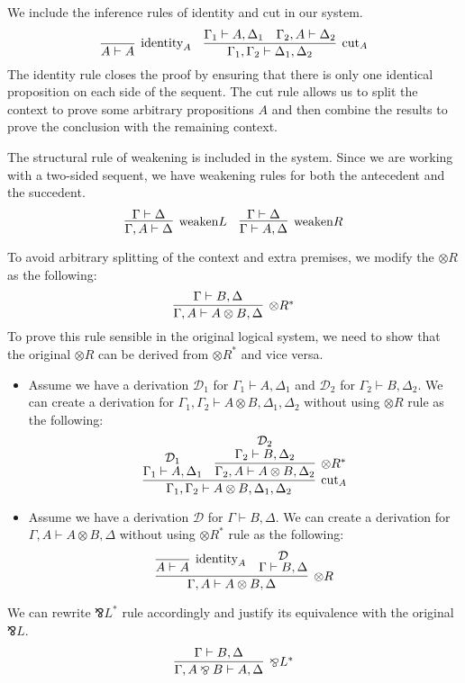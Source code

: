 \documentclass[12pt, openany]{memoir}
\newcommand*{\pare}[0]{\mathbin{\bindnasrepma}}
\begin{document}
We include the inference rules of identity and cut in our system.
\[
  \infer[\text{identity}_A]{A \vdash A}{}
  \quad
  \infer[\text{cut}_A]{\Gamma_1, \Gamma_2 \vdash \Delta_1, \Delta_2}{
    \Gamma_1 \vdash A, \Delta_1
    &
    \Gamma_2, A \vdash \Delta_2
  }
\]
The identity rule closes the proof by ensuring that there is only one identical proposition on each side of the sequent. 
The cut rule allows us to split the context to prove some arbitrary propositions $A$ 
and then combine the results to prove the conclusion with the remaining context.

The structural rule of weakening is included in the system. Since we are working with a two-sided sequent, 
we have weakening rules for both the antecedent and the succedent.
\[
  \infer[\text{weaken}L]{
    \Gamma, A \vdash \Delta
  }{
    \Gamma \vdash \Delta
  }
  \quad
  \infer[\text{weaken}R]{
    \Gamma \vdash A, \Delta
  }{
    \Gamma \vdash \Delta
  }
\]

To avoid arbitrary splitting of the context and extra premises, we modify the $\otimes R$ as the following:
\[
  \infer[\otimes R^*]{\Gamma, A \vdash A \otimes B, \Delta}{
    \Gamma \vdash B, \Delta
  }
\]
To prove this rule sensible in the original logical system, we need to show that the original $\otimes R$ can be derived from $\otimes R^*$ and vice versa.
\begin{itemize}
  \item Assume we have a derivation $\mathcal{D}_1$ for $\Gamma_1 \vdash A, \Delta_1$ and $\mathcal{D}_2$ for $\Gamma_2 \vdash B, \Delta_2$.
  We can create a derivation for $\Gamma_1, \Gamma_2 \vdash A \otimes B, \Delta_1, \Delta_2$ without using $\otimes R$ rule as the following:
  \[
    \infer[\text{cut}_A]{\Gamma_1, \Gamma_2 \vdash A \otimes B, \Delta_1, \Delta_2}{
      \deduce{\Gamma_1 \vdash A, \Delta_1}{\mathcal{D}_1}
      &
      \infer[\otimes R^*]{\Gamma_2, A \vdash A \otimes B, \Delta_2}{
        \deduce{\Gamma_2 \vdash B, \Delta_2}{\mathcal{D}_2}
      }
    }
  \]
  \item Assume we have a derivation $\mathcal{D}$ for $\Gamma \vdash B, \Delta$.
  We can create a derivation for $\Gamma, A \vdash A \otimes B, \Delta$ without using $\otimes R^*$ rule as the following:
  \[
    \infer[\otimes R]{\Gamma, A \vdash A \otimes B, \Delta}{
      \infer[\text{identity}_A]{A \vdash A}{}
      &
      \deduce{\Gamma \vdash B, \Delta}{\mathcal{D}}
    }
  \]
\end{itemize}
We can rewrite $\pare L^*$ rule accordingly and justify its equivalence with the original $\pare L$. 
\[
  \infer[\pare L^*]{\Gamma, A \pare B \vdash A, \Delta}{
    \Gamma \vdash B, \Delta
  }
\]
\end{document}
